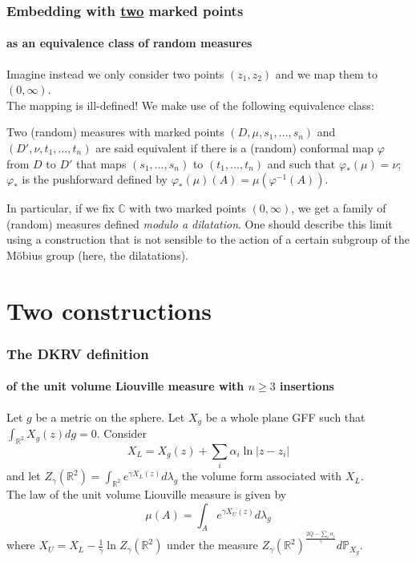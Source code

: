 \documentclass[aspectratio=169]{beamer}
\begin{document}
\begin{frame}
\frametitle{Embedding with \underline{two} marked points}
\framesubtitle{as an equivalence class of random measures}
Imagine instead we only consider two points $(z_1,z_2)$ and we map them to $(0,\infty)$.\\
The mapping is ill-defined! We make use of the following equivalence class:
\begin{definition}
Two (random) measures with marked points $(D,\mu,s_1,\dots,s_n)$ and $(D',\nu,t_1,\dots,t_n)$ are said equivalent if there is a (random) conformal map $\varphi$ from $D$ to $D'$ that maps $(s_1,\dots,s_n)$ to $(t_1,\dots,t_n)$ and such that $\varphi_*(\mu)=\nu$; $\varphi_*$ is the pushforward defined by $\varphi_*(\mu)(A)=\mu(\varphi^{-1}(A))$.
\end{definition}
In particular, if we fix $\mathbb{C}$ with two marked points $(0,\infty)$, we get a family of (random) measures defined \emph{modulo a dilatation}. One should describe this limit using a construction that is not sensible to the action of a certain subgroup of the M\"obius group (here, the dilatations).
\end{frame}


\section{Two constructions}

\begin{frame}
\frametitle{The DKRV definition}
\framesubtitle{of the unit volume Liouville measure with $n\geq 3$ insertions}
\begin{definition}
Let $g$ be a metric on the sphere. Let $X_g$ be a whole plane GFF such that $\int_{\mathbb{R}^2}X_g(z)dg=0$.
Consider
$$X_L=X_g(z)+\sum_i\alpha_i\ln|z-z_i|$$
and let $Z_\gamma(\mathbb{R}^2)=\int_{\mathbb{R}^2}e^{\gamma X_L(z)}d\lambda_g$ the volume form associated with $X_L$.\\
The law of the unit volume Liouville measure is given by
$$\mu(A)=\int_{A}e^{\gamma X_U(z)}d\lambda_g$$
where $X_U=X_L-\frac{1}{\gamma}\ln Z_\gamma(\mathbb{R}^2)$ under the measure $Z_\gamma(\mathbb{R}^2)^{\frac{2Q-\sum_i\alpha_i}{\gamma}}d\mathbb{P}_{X_g}$.
\end{definition}
\end{frame}
\end{document}
